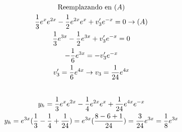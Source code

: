 \documentclass{article}
\begin{document}
\begin{gather*}
\vspace{0.5em} \\
\text{Reemplazando en }(A) \\
 \frac{1}{3}e^{x}e^{2x}-\frac{1}{2}e^{2x}e^{x}+v_{3}'e^{-x}=0    \rightarrow (A) \\
\frac{1}{3}e^{3x}-\frac{1}{2}e^{3x}+v_{3}'e^{-x}=0 \\
-\frac{1}{6}e^{3x}=-v_{3}'e^{-x} \\
v_{3}'=\frac{1}{6}e^{4x} \rightarrow v_{3} =\frac{1}{24}e^{4x} \\
\vspace{0.5em} \\
y_{h}= \frac{1}{3}e^{x}e^{2x}-\frac{1}{4}e^{2x}e^{x}+\frac{1}{24}e^{4x}e^{-x} \\
y_{h}=e^{3x}(\frac{1}{3}-\frac{1}{4}+\frac{1}{24})=e^{3x}(\frac{8-6+1}{24})=\frac{3}{24}e^{3x} = \frac{1}{8}e^{3x}  \\
\vspace{0.5em} \\
\end{gather*}
\end{document}

